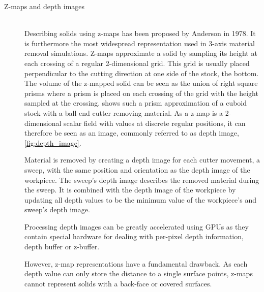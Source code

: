 \begin{description}
	\item[Z-maps and depth images] \hfill \\
	Describing solids using z-maps has been proposed by Anderson \cite{zmap} in 1978.
	It is furthermore the most widespread representation used in 3-axis material removal simulations.
	Z-maps approximate a solid by sampling its height at each crossing of a regular 2-dimensional grid.
	This grid is usually placed perpendicular to the cutting direction at one side of the stock, \eg the bottom.
	The volume of the z-mapped solid can be seen as the union of right square prisms where a prism is placed on each crossing of the grid with the height sampled at the crossing.
	 shows such a prism approximation of a cuboid stock with a ball-end cutter removing material.
	As a z-map is a 2-dimensional scalar field with values at discrete regular positions, it can therefore be seen as an image, commonly referred to as depth image, \cf \cref{fig:depth_image}.

	Material is removed by creating a depth image for each cutter movement, \ie a sweep, with the same position and orientation as the depth image of the workpiece.
	The sweep's depth image describes the removed material during the sweep.
	It is combined with the depth image of the workpiece by updating all depth values to be the minimum value of the workpiece's and sweep's depth image.

	Processing depth images can be greatly accelerated using GPUs as they contain special hardware for dealing with per-pixel depth information, \ie depth buffer or z-buffer.

	However, z-map representations have a fundamental drawback.
	As each depth value can only store the distance to a single surface points, z-maps cannot represent solids with a back-face or covered surfaces.


\end{description}
